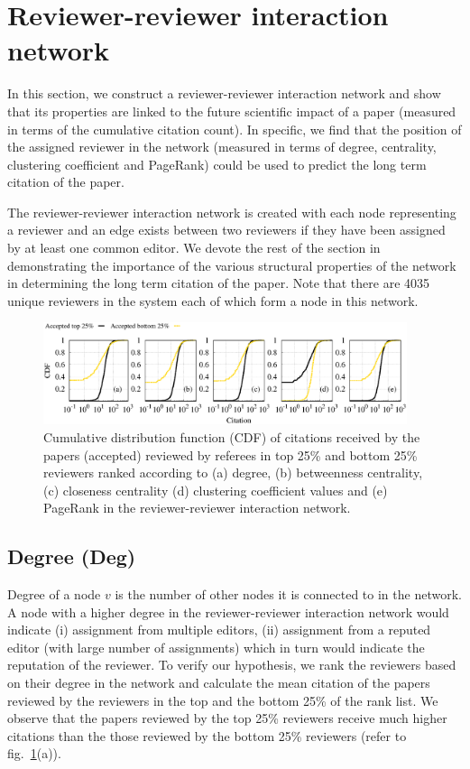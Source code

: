\noindent
\section{Reviewer-reviewer interaction network}
\label{rev_int_net}
In this section, we construct a reviewer-reviewer interaction network and show that its properties are linked to the future scientific impact of a paper (measured in terms of the cumulative citation count). In specific, we find that the position of the assigned reviewer in the network (measured in terms of degree, centrality, clustering coefficient and PageRank) could be used to predict the long term citation of the paper. 
 
The reviewer-reviewer interaction network is created with each node representing a reviewer and an edge exists between two reviewers if they have been assigned by at least one common editor. We devote the rest of the section in demonstrating the importance of the various structural properties of the network in determining the long term citation of the paper. Note that there are 4035 unique reviewers in the system each of which form a node in this network.

\begin{figure}
\centering
\includegraphics[width = 0.95\textwidth]{figures/citation_.eps} 
\caption{\label{fig:net_citation} Cumulative distribution function (CDF) of citations received by the papers (accepted) reviewed by referees in top 25\% and bottom 25\% reviewers ranked according to (a) degree, (b) betweenness centrality, (c) closeness centrality (d) clustering coefficient values and (e) PageRank in the reviewer-reviewer interaction network.}
\end{figure}

\subsection{Degree (Deg)}
Degree of a node $v$ is the number of other nodes it is connected to in the network. A node with a higher degree in the reviewer-reviewer interaction network would indicate (i) assignment from multiple editors, (ii) assignment from a reputed editor (with large number of assignments) which in turn would indicate the reputation of the reviewer. To verify our hypothesis, we rank the reviewers based on their degree in the network and calculate the mean citation of the papers reviewed by the reviewers in the top and the bottom 25\% of the rank list. We observe that  the papers reviewed by the top 25\% reviewers receive much higher citations than the those reviewed by the bottom 25\% reviewers (refer to fig.~\ref{fig:net_citation}(a)).    


